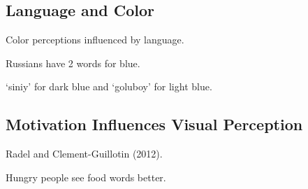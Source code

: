 \subsection{Language and Color}

\begin{coloredlist}
    \item Color perceptions influenced by language.
    \item Russians have 2 words for blue.
    \begin{coloredlist}
        \item `siniy' for dark blue and `goluboy' for light blue.
    \end{coloredlist}
\end{coloredlist}

\subsection{Motivation Influences Visual Perception}

\begin{coloredlist}
    \item Radel and Clement-Guillotin (2012).
    \begin{coloredlist}
        \item Hungry people see food words better.
    \end{coloredlist}
\end{coloredlist}



